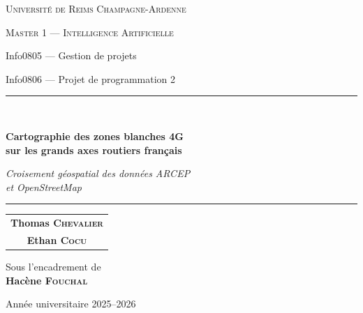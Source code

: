 \documentclass[11pt,a4paper]{article}
\begin{document}
\begin{titlepage}
\thispagestyle{empty}
\centering

\vspace*{0.5cm}
{\scshape\Large Université de Reims Champagne-Ardenne\par}
{\scshape\large Master 1 — Intelligence Artificielle\par}
\vspace{0.4cm}
{\large Info0805 — Gestion de projets\par}
\vspace{0.1cm}
{\large Info0806 — Projet de programmation 2\par}

\vfill

\rule{\linewidth}{1pt}\\[0.8cm]
{\huge\bfseries Cartographie des zones blanches 4G\\[0.4cm]
sur les grands axes routiers français\par}
\vspace{0.8cm}
{\Large\itshape Croisement géospatial des données ARCEP\\et OpenStreetMap\par}
\vspace{0.6cm}
\rule{\linewidth}{1pt}

\vfill

{\large
\begin{tabular}{c}
  \textbf{Thomas \textsc{Chevalier}} \\[0.3cm]
  \textbf{Ethan \textsc{Cocu}}
\end{tabular}\par}

\vspace{1.2cm}

{\large Sous l'encadrement de\\[0.2cm]
\textbf{Hacène \textsc{Fouchal}}\par}

\vfill

{\large Année universitaire 2025--2026\par}
\vspace{0.5cm}

\end{titlepage}

\thispagestyle{empty}
\tableofcontents
\newpage
\end{document}

